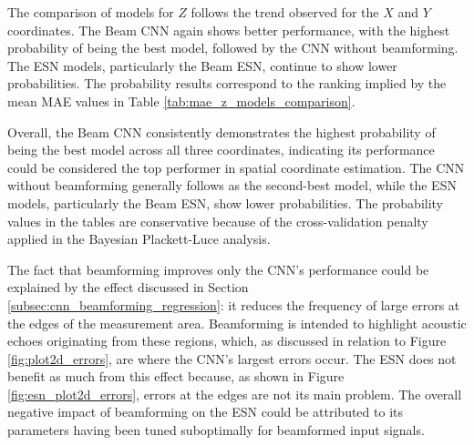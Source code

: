 The comparison of models for $Z$ follows the trend observed for the $X$ and $Y$ coordinates. The Beam CNN again shows better performance, with the highest probability of being the best model, followed by the CNN without beamforming. The ESN models, particularly the Beam ESN, continue to show lower probabilities. The probability results correspond to the ranking implied by the mean MAE values in Table \ref{tab:mae_z_models_comparison}.


Overall, the Beam CNN consistently demonstrates the highest probability of being the best model across all three coordinates, indicating its performance could be considered the top performer in spatial coordinate estimation. The CNN without beamforming generally follows as the second-best model, while the ESN models, particularly the Beam ESN, show lower probabilities. The probability values in the tables are conservative because of the cross-validation penalty applied in the Bayesian Plackett-Luce analysis.

The fact that beamforming improves only the CNN's performance could be explained by the effect discussed in Section \ref{subsec:cnn_beamforming_regression}: it reduces the frequency of large errors at the edges of the measurement area. Beamforming is intended to highlight acoustic echoes originating from these regions, which, as discussed in relation to Figure \ref{fig:plot2d_errors}, are where the CNN's largest errors occur. The ESN does not benefit as much from this effect because, as shown in Figure \ref{fig:esn_plot2d_errors}, errors at the edges are not its main problem. The overall negative impact of beamforming on the ESN could be attributed to its parameters having been tuned suboptimally for beamformed input signals.

